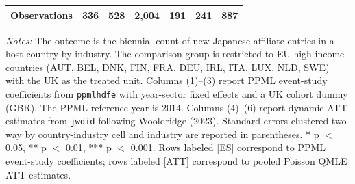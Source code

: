 \begin{table}[!htbp]
\begin{threeparttable}
\begin{tabular}{l*{6}{c}}
\midrule
Observations        &         336   &         528   &       2,004   &         191   &         241   &         887   \\
\bottomrule\end{tabular}\begin{tablenotes}[flushleft]\footnotesize\item \textit{Notes:} The outcome is the biennial count of new Japanese affiliate entries in a host country by industry. The comparison group is restricted to EU high-income countries (AUT, BEL, DNK, FIN, FRA, DEU, IRL, ITA, LUX, NLD, SWE) with the UK as the treated unit. Columns (1)--(3) report PPML event-study coefficients from \texttt{ppmlhdfe} with year-sector fixed effects and a UK cohort dummy (GBR). The PPML reference year is 2014. Columns (4)--(6) report dynamic ATT estimates from \texttt{jwdid} following Wooldridge (2023). Standard errors clustered two-way by country-industry cell and industry are reported in parentheses. * p \(<\) 0.05, ** p \(<\) 0.01, *** p \(<\) 0.001. Rows labeled [ES] correspond to PPML event-study coefficients; rows labeled [ATT] correspond to pooled Poisson QMLE ATT estimates. \end{tablenotes}\end{threeparttable}\end{table}
